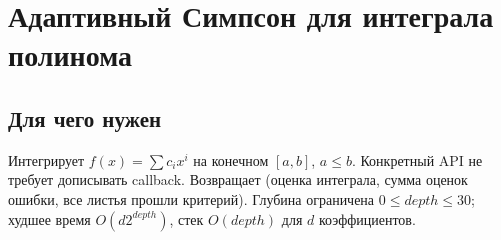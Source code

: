 %

\iffalse
\section{Адаптивный Симпсон для интеграла полинома}
\subsection*{Для чего нужен}
Интегрирует $f(x)=\sum c_i x^i$ на конечном $[a,b]$, $a\le b$.
Конкретный API не требует дописывать callback. Возвращает
(оценка интеграла, сумма оценок ошибки, все листья прошли критерий).
Глубина ограничена $0\le depth\le30$; худшее время $O(d2^{depth})$,
стек $O(depth)$ для $d$ коэффициентов.
